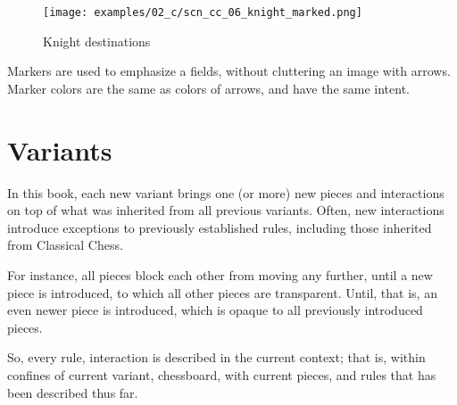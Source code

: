 \vspace*{-0.7\baselineskip}
\noindent
\begin{wrapfigure}[6]{l}{0.4\textwidth}
\centering
\texttt{[image: examples/02\_c/scn\_cc\_06\_knight\_marked.png]}
\vspace*{-1.4\baselineskip}
\caption{Knight destinations}
\label{fig:scn_cc_06_knight_marked}
\end{wrapfigure}
Markers are used to emphasize a fields, without cluttering an image with arrows. \newline
\indent
Marker colors are the same as colors of arrows, and have the same intent.


\clearpage %

\section*{Variants}
\label{sec:Classical Chess/Variants}

In this book, each new variant brings one (or more) new pieces and interactions
on top of what was inherited from all previous variants. Often, new interactions
introduce exceptions to previously established rules, including those inherited
from Classical Chess.

For instance, all pieces block each other from moving any further, until a new
piece is introduced, to which all other pieces are transparent. Until, that is,
an even newer piece is introduced, which is opaque to all previously introduced
pieces.


So, every rule, interaction is described in the current context; that is, within
confines of current variant, chessboard, with current pieces, and rules that has
been described thus far.

